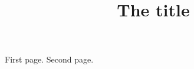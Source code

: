 \documentclass{article}
\title{The title}\author{}\date{}
\begin{document}
\maketitle
First page.
\newpage
Second page.
\end{document}
